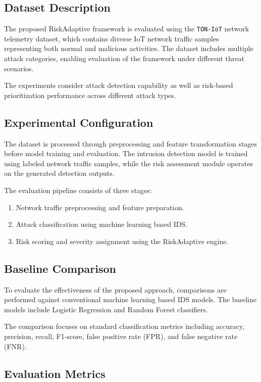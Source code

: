 \subsection{Dataset Description}

The proposed RiskAdaptive framework is evaluated using the \texttt{TON-IoT}
network telemetry dataset, which contains diverse IoT network traffic
samples representing both normal and malicious activities. The dataset
includes multiple attack categories, enabling evaluation of the
framework under different threat scenarios.

The experiments consider attack detection capability as well as
risk-based prioritization performance across different attack types.


\subsection{Experimental Configuration}

The dataset is processed through preprocessing and feature
transformation stages before model training and evaluation. The
intrusion detection model is trained using labeled network traffic
samples, while the risk assessment module operates on the generated
detection outputs.

The evaluation pipeline consists of three stages:

\begin{enumerate}
\item Network traffic preprocessing and feature preparation.
\item Attack classification using machine learning based IDS.
\item Risk scoring and severity assignment using the RiskAdaptive
engine.
\end{enumerate}


\subsection{Baseline Comparison}

To evaluate the effectiveness of the proposed approach, comparisons
are performed against conventional machine learning based IDS models.
The baseline models include Logistic Regression and Random Forest
classifiers.

The comparison focuses on standard classification metrics including
accuracy, precision, recall, F1-score, false positive rate (FPR), and
false negative rate (FNR).


\subsection{Evaluation Metrics}

